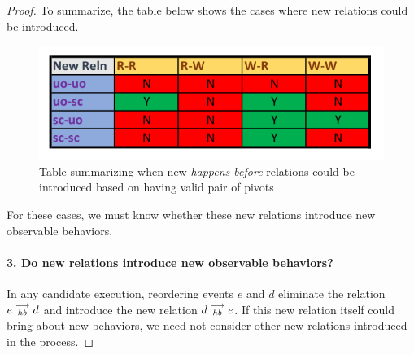 \begin{proof}
       
       
        
        
        
      
        To summarize, the table below shows the cases where new relations could be introduced. 
        \begin{figure}[H]
            \centering
            \includegraphics[scale=0.7]{Table2_Final.pdf}
            \caption{Table summarizing when new \textit{happens-before} relations could be introduced based on having valid pair of pivots }
            \label{fig:my_label}
        \end{figure}

        For these cases, we must know whether these new relations introduce new observable behaviors. 
        
        \paragraph{3. Do new relations introduce new observable behaviors?}
        In any candidate execution, reordering events $e$ and $d$ eliminate the relation $e\stackrel{\longrightarrow}{_{hb}}d$ and introduce the new relation $d\stackrel{\longrightarrow}{_{hb}}e$. If this new relation itself could bring about new behaviors, we need not consider other new relations introduced in the process. 
        

\end{proof}
